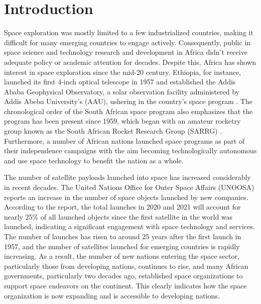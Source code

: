\documentclass[final,5p,times, twocolumn, sort&compress, sc]{elsarticle}
\begin{document}
\section{Introduction}
	Space exploration was mostly limited to a few industrialized countries, making it difficult for many emerging countries to engage actively. Consequently, public in space science and technology research and development in Africa didn't receive adequate policy or academic attention for decades. Despite this, Africa has shown interest in space exploration since the mid-20 century. Ethiopia, for instance, launched its first 4-inch optical telescope in 1957 and established the Addis Ababa Geophysical Observatory, a solar observation facility administered by Addis Abeba University's (AAU), ushering in the country's space program \cite{gadisa2023odyssey}. The chronological order of the South African space program also emphasizes that the program has been present since 1959, which began with an amateur rocketry group known as the South African Rocket Research Group (SARRG) \cite{gottschalk2010south}. Furthermore, a number of African nations launched space programs as part of their independence campaigns with the aim becoming technologically autonomous and use space technology to benefit the nation as a whole.
	
	The number of satellite payloads launched into space has increased considerably in recent decades. The United Nations Office for Outer Space Affairs (UNOOSA) \cite{andy2023} reports an increase in the number of space objects launched by new companies. According to the report, the total launches in 2020 and 2021 will account for nearly 25\% of all launched objects since the first satellite in the world was launched, indicating a significant engagement with space technology and services. The number of launches has risen to around 25 years after the first launch in 1957, and the number of satellites launched for emerging countries is rapidly increasing. As a result, the number of new nations entering the space sector, particularly those from developing nations, continues to rise, and many African governments, particularly two decades ago, established space organizations to support space endeavors on the continent. This clearly indicates how the space organization is now expanding and is accessible to developing nations.
	
	
\end{document}

